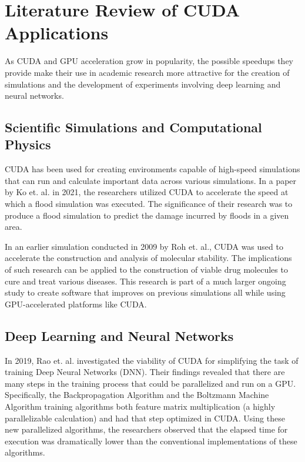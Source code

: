 \documentclass[11pt]{report}
\begin{document}
    

\section{Literature Review of CUDA Applications}
As CUDA and GPU acceleration grow in popularity, the possible speedups they provide make their use in academic research more attractive for the creation of simulations and the development of experiments involving deep learning and neural networks. 

    \subsection{Scientific Simulations and Computational Physics}
    CUDA has been used for creating environments capable of high-speed simulations that can run and calculate important data across various simulations. In a paper by Ko et. al. in 2021\cite{FLOOD_SIMULATION}, the researchers utilized CUDA to accelerate the speed at which a flood simulation was executed. The significance of their research was to produce a flood simulation to predict the damage incurred by floods in a given area.

    In an earlier simulation conducted in 2009 by Roh et. al.\cite{MOLECULAR_DOCKING}, CUDA was used to accelerate the construction and analysis of molecular stability. The implications of such research can be applied to the construction of viable drug molecules to cure and treat various diseases. This research is part of a much larger ongoing study to create software that improves on previous simulations all while using GPU-accelerated platforms like CUDA\cite{AUTODOC_MOLECULARDOCKING}.
    
    \subsection{Deep Learning and Neural Networks}
    In 2019, Rao et. al. investigated the viability of CUDA for simplifying the task of training Deep Neural Networks (DNN)\cite{ACCELERATING_DNN}. Their findings revealed that there are many steps in the training process that could be parallelized and run on a GPU. Specifically, the Backpropagation Algorithm and the Boltzmann Machine Algorithm training algorithms both feature matrix multiplication (a highly parallelizable calculation) and had that step optimized in CUDA. Using these new parallelized algorithms, the researchers observed that the elapsed time for execution was dramatically lower than the conventional implementations of these algorithms.
\end{document}

